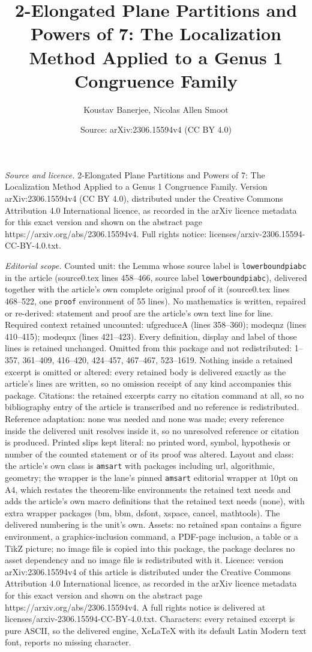 \documentclass[10pt,a4paper]{amsart}
\title[2-Elongated Plane Partitions and Powers of 7: The Localizati]{2-Elongated Plane Partitions and Powers of 7: The Localization Method Applied to a Genus 1 Congruence Family}
\author{Koustav Banerjee, Nicolas Allen Smoot}
\date{Source: arXiv:2306.15594v4 (CC BY 4.0)}
\begin{document}
\maketitle

\noindent\emph{Source and licence.} 2-Elongated Plane Partitions and Powers of 7: The Localization Method Applied to a Genus 1 Congruence Family. Version arXiv:2306.15594v4 (CC BY 4.0), distributed under the Creative Commons Attribution 4.0 International licence, as recorded in the arXiv licence metadata for this exact version and shown on the abstract page https://arxiv.org/abs/2306.15594v4. Full rights notice: licenses/arxiv-2306.15594-CC-BY-4.0.txt.\par\smallskip

\noindent\textit{Editorial scope.} Counted unit: the Lemma whose source label is \texttt{lowerboundpiabc} in the article (source0.tex lines 458--466, source label \texttt{lowerboundpiabc}), delivered together with the article's own complete original proof of it (source0.tex lines 468--522, one \texttt{proof} environment of 55 lines). No mathematics is written, repaired or re-derived: statement and proof are the article's own text line for line. Required context retained uncounted: ufgreduceA (lines 358--360); modeqnz (lines 410--415); modeqnx (lines 421--423). Every definition, display and label of those lines is retained unchanged. Omitted from this package and not redistributed: 1--357, 361--409, 416--420, 424--457, 467--467, 523--1619. Nothing inside a retained excerpt is omitted or altered: every retained body is delivered exactly as the article's lines are written, so no omission receipt of any kind accompanies this package. Citations: the retained excerpts carry no citation command at all, so no bibliography entry of the article is transcribed and no reference is redistributed. Reference adaptation: none was needed and none was made; every reference inside the delivered unit resolves inside it, so no unresolved reference or citation is produced. Printed slips kept literal: no printed word, symbol, hypothesis or number of the counted statement or of its proof was altered. Layout and class: the article's own class is \texttt{amsart} with packages including url, algorithmic, geometry; the wrapper is the lane's pinned \texttt{amsart} editorial wrapper at 10pt on A4, which restates the theorem-like environments the retained text needs and adds the article's own macro definitions that the retained text needs (none), with extra wrapper packages (bm, bbm, dsfont, xspace, cancel, mathtools). The delivered numbering is the unit's own. Assets: no retained span contains a figure environment, a graphics-inclusion command, a PDF-page inclusion, a table or a TikZ picture; no image file is copied into this package, the package declares no asset dependency and no image file is redistributed with it. Licence: version arXiv:2306.15594v4 of this article is distributed under the Creative Commons Attribution 4.0 International licence, as recorded in the arXiv licence metadata for this exact version and shown on the abstract page https://arxiv.org/abs/2306.15594v4. A full rights notice is delivered at licenses/arxiv-2306.15594-CC-BY-4.0.txt. Characters: every retained excerpt is pure ASCII, so the delivered engine, XeLaTeX with its default Latin Modern text font, reports no missing character.
\end{document}

